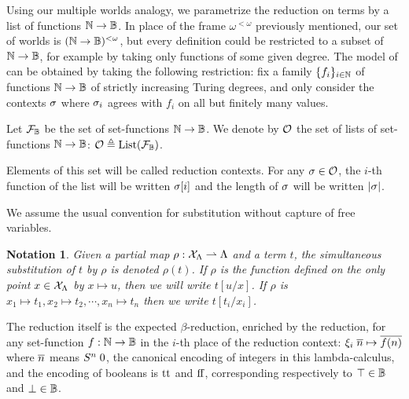 \documentclass[a4paper,UKenglish,cleveref, autoref, thm-restate]{lipics-v2021}
\newtheorem{notation}[definition]{Notation}
\begin{document}
Using our multiple worlds analogy, we parametrize the reduction on terms by a list of functions $\mathbb N \to \mathbb B$. In place of the frame $\omega^{<\omega}$ previously mentioned, our set of worlds is $(\mathbb N \to \mathbb B)^{<\omega}$, but every definition could be restricted to a subset of $\mathbb N \to \mathbb B$, for example by taking only functions of some given degree. The model of \cite{LubRat13}
can be obtained by taking the following restriction: fix a family $\{f_i\}_{i \in \mathbb N}$ of functions $\mathbb N \to \mathbb B$ of strictly increasing Turing degrees, and only consider the contexts $\sigma$ where $\sigma_i$ agrees with $f_i$ on all but finitely many values.

\begin{definition}
  Let $\mathcal F_{\mathbb B}$ be the set of set-functions $\mathbb N \to \mathbb B$. We denote by $\mathcal O$ the set of lists of set-functions $\mathbb N \to \mathbb B$:
  $\mathcal O \triangleq \mathrm{List}(\mathcal F_{\mathbb B})$.
  
  Elements of this set will be called reduction contexts. For any $\sigma \in \mathcal O$, the $i$-th function of the list will be written $\sigma[i]$ and the length of $\sigma$ will be written $|\sigma|$.
\end{definition}

We assume the usual convention for substitution without capture of free variables.

\begin{notation}
  Given a partial map $\rho : \mathcal{X}_\Lambda \rightharpoonup \Lambda$ and a term $t$, the simultaneous substitution of $t$ by $\rho$ is denoted $\rho(t)$. If $\rho$ is the function defined on the only point $x \in \mathcal{X}_\Lambda$ by $x \mapsto u$, then we will write $t[u/x]$. If $\rho$ is $x_1 \mapsto t_1, x_2 \mapsto t_2, \cdots, x_n \mapsto t_n$ then we write $t[t_i/x_i]$.
\end{notation}

The reduction itself is the expected $\beta$-reduction, enriched by the reduction, for
any set-function $f : \mathbb N \to \mathbb B$ in the $i$-th place of the reduction context: $\xi_i \;\overline{n} \mapsto \overline{f(n)}$
where $\overline{n}$ means $S^n\;0$, the canonical encoding of integers in this lambda-calculus, and the encoding of booleans is $\mathrm{tt}$ and $\mathrm{ff}$, corresponding respectively to $\top \in \mathbb B$ and $\bot \in \mathbb B$.
\end{document}
